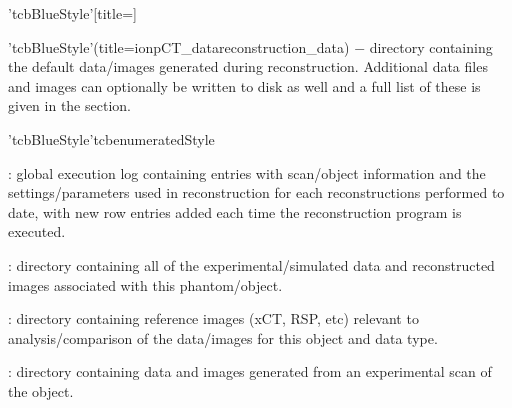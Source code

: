 \clearpage%
\begin{tcbenvironment}'tcbBlueStyle'[title=]
\begin{tcbparagraph}'tcbBlueStyle'(title=\dirsep ion\dirsep pCT\_data\dirsep reconstruction\_data)%
$\boldsymbol{-}$ directory containing the default data/images generated during reconstruction.  Additional data files and images can optionally be written to disk as well and a full list of these is given in the  section.
\end{tcbparagraph}
\begin{tcbparagraph}'tcbBlueStyle'{tcbenumeratedStyle}
    \begin{ThinEnum}
	  \item {} : global execution log containing entries with scan/object information and the settings/parameters used in reconstruction for each reconstructions performed to date, with new row entries added each time the reconstruction program is executed.
	  \item {} : directory containing all of the experimental/simulated data and reconstructed images associated with this phantom/object.
        \begin{ThinEnum}
            \item {} : directory containing reference images (xCT, RSP, etc) relevant to analysis/comparison of the data/images for this object and data type.
            \item {} : directory containing data and images generated from an experimental scan of the object.
            \begin{ThinEnum}

\end{ThinEnum}
\end{ThinEnum}
\end{ThinEnum}
\end{tcbparagraph}
\end{tcbenvironment}
